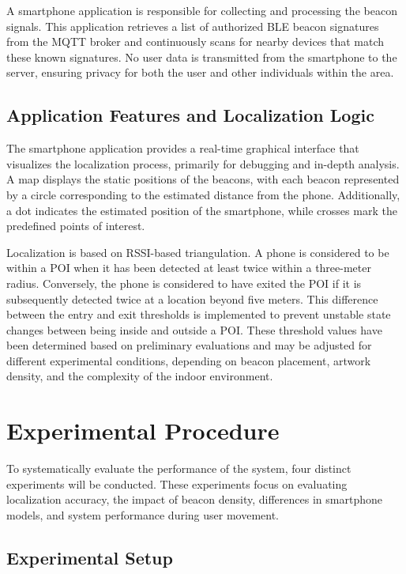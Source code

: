 A smartphone application is responsible for collecting and processing the beacon signals. This application retrieves a list of authorized BLE beacon signatures from the MQTT broker and continuously scans for nearby devices that match these known signatures. No user data is transmitted from the smartphone to the server, ensuring privacy for both the user and other individuals within the area.

\subsection{Application Features and Localization Logic}

The smartphone application provides a real-time graphical interface that visualizes the localization process, primarily for debugging and in-depth analysis. A map displays the static positions of the beacons, with each beacon represented by a circle corresponding to the estimated distance from the phone. Additionally, a dot indicates the estimated position of the smartphone, while crosses mark the predefined points of interest.

Localization is based on RSSI-based triangulation. A phone is considered to be within a POI when it has been detected at least twice within a three-meter radius. Conversely, the phone is considered to have exited the POI if it is subsequently detected twice at a location beyond five meters. This difference between the entry and exit thresholds is implemented to prevent unstable state changes between being inside and outside a POI. These threshold values have been determined based on preliminary evaluations and may be adjusted for different experimental conditions, depending on beacon placement, artwork density, and the complexity of the indoor environment.

\section{Experimental Procedure}

To systematically evaluate the performance of the system, four distinct experiments will be conducted. These experiments focus on evaluating localization accuracy, the impact of beacon density, differences in smartphone models, and system performance during user movement.

\subsection{Experimental Setup}

